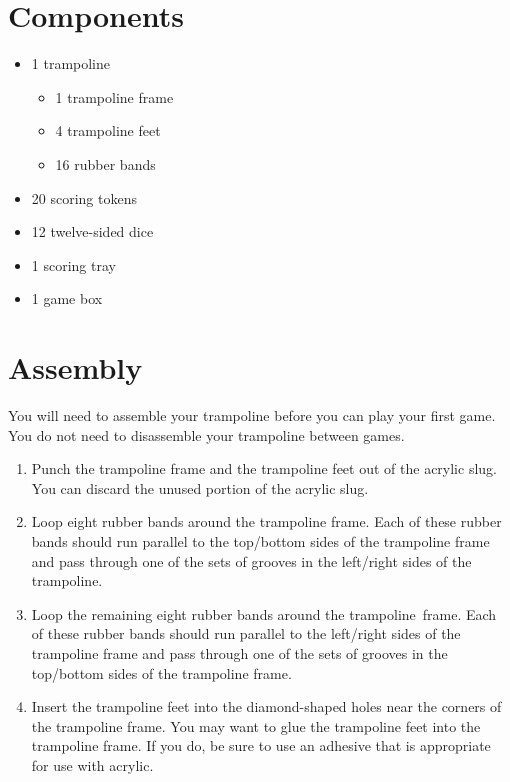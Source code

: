 \documentclass[parskip=half]{scrartcl}
\begin{document}
\newpage

\section*{Components}
\begin{multicols}{2}
\begin{itemize}[leftmargin=*]
	\item 1 trampoline
	\begin{itemize}[leftmargin=*]
		\item 1 trampoline frame
		\item 4 trampoline feet
		\item 16 rubber bands
	\end{itemize}
	\item 20 scoring tokens
	\item 12 twelve-sided dice
	\item 1 scoring tray
	\item 1 game box
\end{itemize}
\end{multicols}
\section*{Assembly}
You will need to assemble your trampoline before you can play your first game. You do not need to disassemble your trampoline between games. 

\begin{enumerate}[leftmargin=*]
\item Punch the trampoline frame and the trampoline feet out of the acrylic slug. You can discard the unused portion of the acrylic slug.
\item Loop eight rubber bands around the trampoline frame. Each of these rubber bands should run parallel to the top/bottom sides of the trampoline frame and pass through one of the sets of grooves in the left/right sides of the trampoline.
\item Loop the remaining eight rubber bands around the trampoline~frame. Each of these rubber bands should run parallel to the left/right sides of the trampoline frame and pass through one of the sets of grooves in the top/bottom sides of the trampoline frame. 
\item Insert the trampoline feet into the diamond-shaped holes near the corners of the trampoline frame. You may want to glue the trampoline feet into the trampoline frame. If you do, be sure to use an adhesive that is appropriate for use with acrylic.
\end{enumerate}
\end{document}

